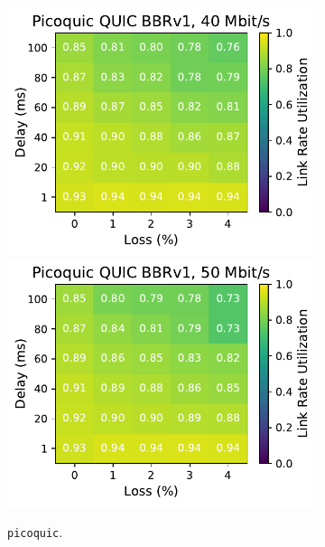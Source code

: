 \begin{figure}[ht]
\begin{subfigure}[b]{0.22\linewidth}
        \includegraphics[width=\linewidth,trim={0 0 2cm 0},clip]{splitting-paper/figures/heatmaps/heatmap_picoquic_bbr1_40mbps.pdf}
        \includegraphics[width=\linewidth,trim={0 0 2cm 0},clip]{splitting-paper/figures/heatmaps/heatmap_picoquic_bbr1_50mbps.pdf}
        \caption{\texttt{picoquic}.}
    \end{subfigure}
    \begin{subfigure}[b]{0.89cm}

\end{subfigure}
\end{figure}
